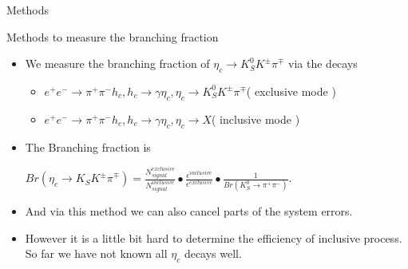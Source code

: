 \documentclass{beamer}
\begin{document}
\begin{frame}{Methods}
    \begin{block}{Methods to measure the branching fraction}
        \begin{itemize}
            \item We measure the branching fraction of $\eta_c\to K_S^0 K^{\pm}\pi^{\mp}$ via the decays
                \begin{itemize}
                    \item $e^+e^-\to \pi^+ \pi^- h_c, h_c\to \gamma\eta_c, \eta_c\to K_S^0 K^{\pm}\pi^{\mp}$( exclusive mode )
                    \item $e^+e^-\to \pi^+ \pi^- h_c, h_c\to \gamma\eta_c, \eta_c\to X$( inclusive mode )
                \end{itemize}
            \item The Branching fraction is\\
                \begin{center}
                    $Br(\eta_c\to K_S K^{\pm}\pi^{\mp}) = \frac{N^{exclusive}_{signal}}{N^{inclusive}_{signal}}\bullet\frac{\epsilon^{inclusive}}{\epsilon^{exclusive}}\bullet\frac{1}{Br(K^0_S\to\pi^+\pi^{-})}$.
                \end{center}
        \end{itemize}
    \end{block}
    \begin{block}{}
        \begin{itemize}
            \item And via this method we can also cancel parts of the system errors.
            \item However it is a little bit hard to determine the efficiency of inclusive process. So far we have not known all $\eta_c$ decays well.
        \end{itemize}
    \end{block}
\end{frame}
\end{document}
